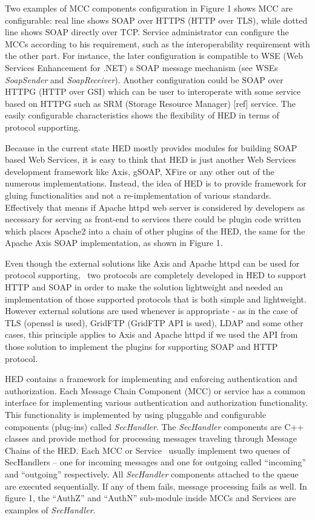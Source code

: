 \documentclass{article}
\begin{document}
Two examples of MCC components configuration in Figure 1 shows MCC are
configurable: real line shows SOAP over HTTPS (HTTP over TLS), while
dotted line shows SOAP directly over TCP. Service administrator can
configure the MCCs according to his requirement, such as the
interoperability requirement with the other part. For instance, the
later configuration is compatible to WSE (Web Services Enhancement for
.NET) {\textquotesingle}s SOAP message mechanism (see
WSE{\textquotesingle}s \textit{SoapSender} and \textit{SoapReceiver}).
Another configuration could be SOAP over HTTPG (HTTP over GSI) which
can be user to interoperate with some service based on HTTPG such as
SRM (Storage Resource Manager) [ref] service. The easily configurable
characteristics shows the flexibility of HED in terms of protocol
supporting.

Because in the current state HED mostly provides modules for building
SOAP based Web Services, it is easy to think that HED is just another
Web Services development framework like Axis, gSOAP, XFire or any other
out of the numerous implementations. Instead, the idea of HED is to
provide framework for gluing functionalities and not a
re-implementation of various standards. Effectively that means if
Apache httpd web server is considered by developers as necessary for
serving as front-end to services there could be plugin code written
which places Apache2 into a chain of other plugins of the HED, the same
for the Apache Axis SOAP implementation, as shown in Figure 1.

Even though the external solutions like Axis and Apache httpd can be
used for protocol supporting, \ two protocols are completely developed
in HED to support HTTP and SOAP in order to make the solution
lightweight and needed an implementation of those supported protocols
that is both simple and lightweight. However external solutions are
used whenever is appropriate - as in the case of TLS (openssl is used),
GridFTP (GridFTP API is used), LDAP and some other cases, this
principle applies to Axis and Apache httpd if we used the API from
those solution to implement the plugins for supporting SOAP and HTTP
protocol. 


\bigskip

HED contains a framework for implementing and enforcing authentication
and authorization. Each Message Chain Component (MCC) or service has a
common interface for implementing various authentication and
authorization functionality. This functionality is implemented by using
pluggable and configurable components (plug-ins) called
\textit{SecHandler}. The \textit{SecHandler} components are C++ classes
and provide method for processing messages traveling through Message
Chains of the HED. Each MCC or Service \ usually implement two queues
of SecHandlers -- one for incoming messages and one for outgoing called
{\textquotedblleft}incoming{\textquotedblright} and
{\textquotedblleft}outgoing{\textquotedblright} respectively. All
\textit{SecHandler} components attached to the queue are executed
sequentially. If any of them fails, message processing fails as well.
In figure 1, the {\textquotedblleft}AuthZ{\textquotedblright} and
{\textquotedblleft}AuthN{\textquotedblright} sub-module inside MCCs and
Services are examples of \textit{SecHandler}.
\end{document}
